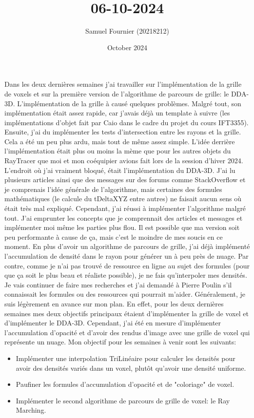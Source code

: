\documentclass{article}
\title{06-10-2024}
\author{Samuel Fournier (20218212)}
\date{October 2024}
\begin{document}
\maketitle

Dans les deux dernières semaines j'ai travailler sur l'implémentation de la grille de voxels et sur la première version
de l'algorithme de parcours de grille: le DDA-3D. L'implémentation de la grille à causé quelques problèmes. Malgré tout,
son implémentation était assez rapide, car j'avais déjà un template à suivre (les implémentations d'objet fait par
Caio dans le cadre du projet du cours IFT3355). Ensuite, j'ai du implémenter les tests d'intersection entre les
rayons et la grille. Cela a été un peu plus ardu, mais tout de même assez simple. L'idée derrière l'implémentation
était plus ou moins la mème que pour les autres objets du RayTracer que moi et mon coéquipier avions fait lors de la
session d'hiver 2024. L'endroit où j'ai vraiment bloqué, était l'implémentation du DDA-3D. J'ai lu plusieurs articles
ainsi que des messages sur des forums comme StackOverflow et je comprenais l'idée générale de l'algorithme, mais
certaines des formules mathématiques (le calcule du tDeltaXYZ entre autres) ne faisait aucun sens où était très mal
expliqué. Cependant, j'ai réussi à implémenter l'algorithme malgré tout. J'ai emprunter les concepts que je
comprennait des articles et messages et implémenter moi même les parties plus flou. Il est possible que ma version
soit peu performante à cause de ça, mais c'est le moindre de mes soucis en ce moment. En plus d'avoir un algorithme
de parcours de grille, j'ai déjà implémenté l'accumulation de densité dans le rayon pour générer un à peu près de nuage.
Par contre, comme je n'ai pas trouvé de ressource en ligne au sujet des formules (pour que ça soit le plus beau et
réaliste possible), je ne fais qu'interpoler mes densités. Je vais continuer de faire mes recherches et j'ai demandé à
Pierre Poulin s'il connaissait les formules ou des ressources qui pourrait m'aider. Généralement, je suis légèrement
en avance sur mon plan. En effet, pour les deux dernières semaines mes deux objectifs principaux étaient d'implémenter
la grille de voxel et d'implémenter le DDA-3D. Cependant, j'ai été en mesure d'implémenter l'accumulation d'opacité et
d'avoir des rendus d'image avec une grille de voxel qui représente un nuage. Mon objectif pour les semaines à venir sont
les suivants:
\begin{itemize}
    \item Implémenter une interpolation TriLinéaire pour calculer les densités pour avoir des densités variés dans un
    voxel, plutôt qu'avoir une densité uniforme.
    \item Paufiner les formules d'accumulation d'opacité et de "coloriage" de voxel.
    \item Implémenter le second algorithme de parcours de grille de voxel: le Ray Marching.
\end{itemize}
\end{document}

